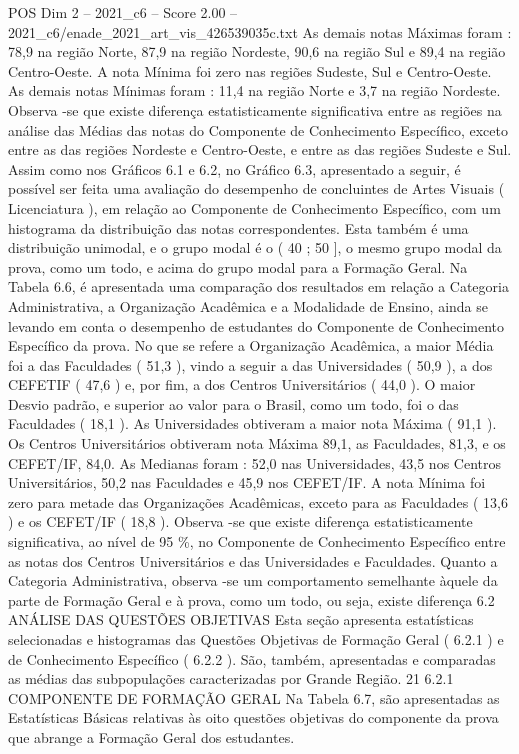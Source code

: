 \begin{textsample}{POS Dim 2 – 2021\_c6 – Score 2.00 – 2021\_c6/enade\_2021\_art\_vis\_426539035c.txt}
As demais notas Máximas foram : 78,9 na região Norte, 87,9 na região Nordeste, 90,6 na região Sul e 89,4 na região Centro-Oeste.
A nota Mínima foi zero nas regiões Sudeste, Sul e Centro-Oeste.
As demais notas Mínimas foram : 11,4 na região Norte e 3,7 na região Nordeste.
Observa -se que existe diferença estatisticamente significativa entre as regiões na análise das Médias das notas do Componente de Conhecimento Específico, exceto entre as das regiões Nordeste e Centro-Oeste, e entre as das regiões Sudeste e Sul.
Assim como nos Gráficos 6.1 e 6.2, no Gráfico 6.3, apresentado a seguir, é possível ser feita uma avaliação do desempenho de concluintes de Artes Visuais ( Licenciatura ), em relação ao Componente de Conhecimento Específico, com um histograma da distribuição das notas correspondentes.
Esta também é uma distribuição unimodal, e o grupo modal é o ( 40 ; 50 ], o mesmo grupo modal da prova, como um todo, e acima do grupo modal para a Formação Geral.
Na Tabela 6.6, é apresentada uma comparação dos resultados em relação a Categoria Administrativa, a Organização Acadêmica e a Modalidade de Ensino, ainda se levando em conta o desempenho de estudantes do Componente de Conhecimento Específico da prova.
No que se refere a Organização Acadêmica, a maior Média foi a das Faculdades ( 51,3 ), vindo a seguir a das Universidades ( 50,9 ), a dos CEFETIF ( 47,6 ) e, por fim, a dos Centros Universitários ( 44,0 ).
O maior Desvio padrão, e superior ao valor para o Brasil, como um todo, foi o das Faculdades ( 18,1 ).
As Universidades obtiveram a maior nota Máxima ( 91,1 ).
Os Centros Universitários obtiveram nota Máxima 89,1, as Faculdades, 81,3, e os CEFET/IF, 84,0.
As Medianas foram : 52,0 nas Universidades, 43,5 nos Centros Universitários, 50,2 nas Faculdades e 45,9 nos CEFET/IF.
A nota Mínima foi zero para metade das Organizações Acadêmicas, exceto para as Faculdades ( 13,6 ) e os CEFET/IF ( 18,8 ).
Observa -se que existe diferença estatisticamente significativa, ao nível de 95 \%, no Componente de Conhecimento Específico entre as notas dos Centros Universitários e das Universidades e Faculdades.
Quanto a Categoria Administrativa, observa -se um comportamento semelhante àquele da parte de Formação Geral e à prova, como um todo, ou seja, existe diferença 6.2 ANÁLISE DAS QUESTÕES OBJETIVAS Esta seção apresenta estatísticas selecionadas e histogramas das Questões Objetivas de Formação Geral ( 6.2.1 ) e de Conhecimento Específico ( 6.2.2 ).
São, também, apresentadas e comparadas as médias das subpopulações caracterizadas por Grande Região. 21 6.2.1 COMPONENTE DE FORMAÇÃO GERAL Na Tabela 6.7, são apresentadas as Estatísticas Básicas relativas às oito questões objetivas do componente da prova que abrange a Formação Geral dos estudantes.

\end{textsample}
